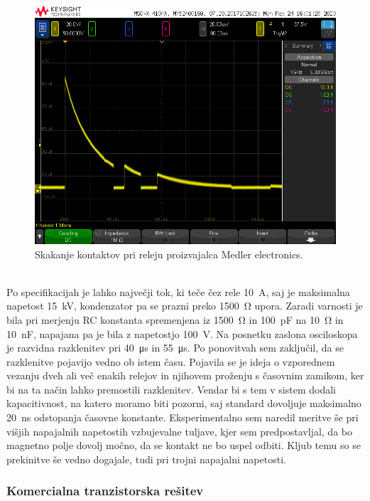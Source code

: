 \documentclass[a4paper,twoside,openright,12pt,Slovene]{book}
\begin{document}
    \begin{figure}[H]
        \centering
        \includegraphics[width=1\columnwidth]{Slike/MedlerElectronicsRele.png}
        \caption{\label{BlokDiagramShema} Skakanje kontaktov pri releju proizvajalca Medler electronics.}
    \end{figure}
    
    ~\\Po specifikacijah je lahko največji tok, ki teče čez rele \SI{10}{\ampere}, saj je maksimalna napetost \SI{15}{\kilo\volt}, kondenzator pa se prazni preko \SI{1500}{\ohm} upora. Zaradi varnosti je bila pri merjenju RC konstanta spremenjena iz \SI{1500}{\ohm} in \SI{100}{\pico\farad} na \SI{10}{\ohm} in \SI{10}{\nano\farad}, napajana pa je bila z napetostjo \SI{100}{\volt}. Na posnetku zaslona osciloskopa je razvidna razklenitev pri \SI{40}{\micro\second} in \SI{55}{\micro\second}. Po ponovitvah sem zaključil, da se razklenitve pojavijo vedno ob istem času. Pojavila se je ideja o vzporednem vezanju dveh ali več enakih relejov in njihovem proženju s časovnim zamikom, ker bi na ta način lahko premostili razklenitev. Vendar bi s tem v sistem dodali kapacitivnost, na katero moramo biti pozorni, saj standard dovoljuje maksimalno \SI{20}{\nano\second} odstopanja časovne konstante.
Eksperimentalno sem naredil meritve še pri višjih napajalnih napetostih vzbujevalne tuljave, kjer sem predpostavljal, da bo magnetno polje dovolj močno, da se kontakt ne bo uspel odbiti. Kljub temu so se prekinitve še vedno dogajale, tudi pri trojni napajalni napetosti.
   
	\subsubsection{Komercialna tranzistorska rešitev} \label{Komercialna tranzistorska rešitev}   
    
\end{document}
